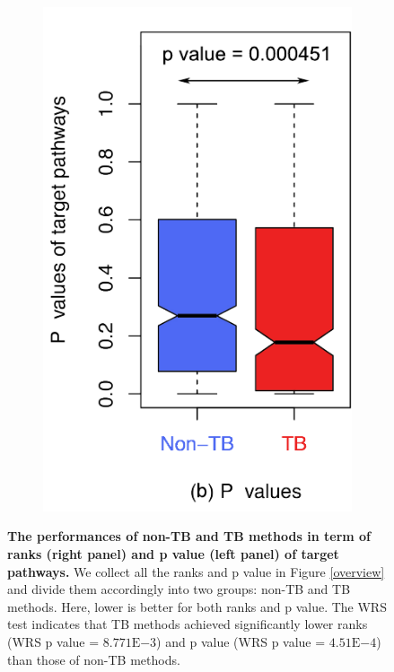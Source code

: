 \documentclass[Minh_PhD_thesis.tex]{subfiles}
\begin{document}
\begin{figure}
\begin{subfigure}[b]{0.3\textwidth}
        \includegraphics[width=1\linewidth]{../Figures/Pvalue_NonTBvsTB}
                \label{pvalue}
        \end{subfigure}
        \caption{\textbf{The performances of non-TB and TB methods in term of ranks (right panel) and p value (left panel) of target pathways.} We collect all the ranks and p value in Figure \ref{overview} and divide them accordingly into two groups: non-TB and TB methods. Here, lower is better for both ranks and p value.    The  WRS test indicates that TB methods achieved significantly lower ranks (WRS p value = $8.771\mathrm{E}{-3}$) and p value (WRS p value = $4.51\mathrm{E}{-4}$) than those of non-TB methods.}
        \label{Fig:nonTBvsTB}
\end{figure}
\end{document}
